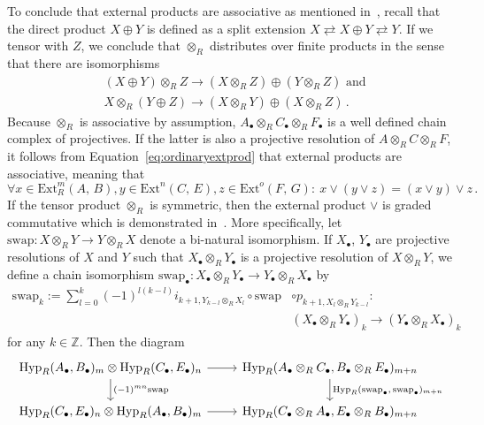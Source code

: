 \documentclass[12pt, a4paper]{article}
\numberwithin{equation}{section}
\theoremstyle{empty}
\theoremstyle{nonumberplain}
\begin{document}
To conclude that external products are associative as mentioned in~\cite[p.~111]{bro82}, recall that the direct product $X \oplus Y$ is defined as a split extension $X \rightleftarrows X \oplus Y \rightleftarrows Y$. If we tensor with $Z$, we conclude that $\otimes_R$ distributes over finite products in the sense that there are isomorphisms
\begin{align*}
&(X \oplus Y) \otimes_R Z \rightarrow (X \otimes_R Z) \oplus (Y \otimes_R Z) \text{ and} \\
&X \otimes_R (Y \oplus Z) \rightarrow (X \otimes_R Y) \oplus (X \otimes_R Z) \, .
\end{align*}
Because $\otimes_R$ is associative by assumption, $A_{\bullet} \otimes_R C_{\bullet} \otimes_R F_{\bullet}$ is a well defined chain complex of projectives. If the latter is also a projective resolution of $A \otimes_R C \otimes_R F$, it follows from Equation~\ref{eq:ordinaryextprod} that external products are associative, meaning that
\begin{equation}\label{eq:extprodassoc}
\forall x \in \mathrm{Ext}_R^m(A{,} \, B), y \in \mathrm{Ext}^n(C{,} \, E), z \in \mathrm{Ext}^o(F{,} \, G): \: x \vee (y \vee z) = (x \vee y) \vee z \, .
\end{equation}
If the tensor product $\otimes_R$ is symmetric, then the external product $\vee$ is graded commutative which is demonstrated in~\cite[p.~111--112]{bro82}. More specifically, let $\mathrm{swap}: X \otimes_R Y \rightarrow Y \otimes_R X$ denote a bi-natural isomorphism. If $X_{\bullet}$, $Y_{\bullet}$ are projective resolutions of $X$ and $Y$ such that $X_{\bullet} \otimes_R Y_{\bullet}$ is a projective resolution of $X \otimes_R Y$, we define a chain isomorphism $\mathrm{swap}_{\bullet}: X_{\bullet} \otimes_R Y_{\bullet} \rightarrow Y_{\bullet} \otimes_R X_{\bullet}$ by
\begin{align}
\mathrm{swap}_k := \sum_{l = 0}^k (-1)^{l(k-l)} i_{k+1, Y_{k-l} \otimes_R X_l} \circ \mathrm{swap} &\circ p_{k+1, X_l \otimes_R Y_{k-l}}: \label{eq:swapchaintensorprod} \\
&(X_{\bullet} \otimes_R Y_{\bullet})_k \rightarrow (Y_{\bullet} \otimes_R X_{\bullet})_k \nonumber
\end{align}
for any $k \in \mathbb{Z}$. Then the diagram
\begin{equation}\label{diag:extprodcommity}
\begin{tikzcd}
    \mathrm{Hyp}_R(A_{\bullet}{,} \, B_{\bullet})_m \otimes \mathrm{Hyp}_R(C_{\bullet}{,} \, E_{\bullet})_n \arrow[r] \arrow[d, "(-1)^{mn}\mathrm{swap}"] & \mathrm{Hyp}_R(A_{\bullet} \otimes_R C_{\bullet}{,} \, B_{\bullet} \otimes_R E_{\bullet})_{m+n} \arrow[d, "\mathrm{Hyp}_R(\mathrm{swap}_{\bullet}{,} \, \mathrm{swap}_{\bullet})_{m+n}"] \\
    \mathrm{Hyp}_R(C_{\bullet}{,} \, E_{\bullet})_n \otimes \mathrm{Hyp}_R(A_{\bullet}{,} \, B_{\bullet})_m \arrow[r] & \mathrm{Hyp}_R(C_{\bullet} \otimes_R A_{\bullet}{,} \, E_{\bullet} \otimes_R B_{\bullet})_{m+n}
\end{tikzcd}
\end{equation}
\end{document}
